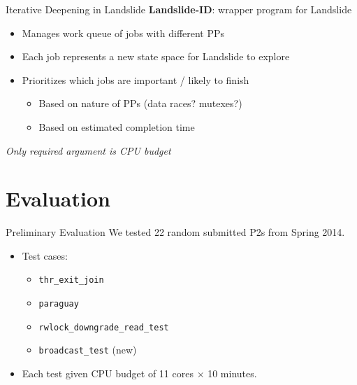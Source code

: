 \documentclass[xcolor=dvipsnames]{beamer}
\begin{document}
\begin{frame}{Iterative Deepening in Landslide}
	\textbf{Landslide-ID}: wrapper program for Landslide
	\begin{itemize}
		\item Manages work queue of jobs with different PPs
		\item Each job represents a new state space for Landslide to explore
		\item Prioritizes which jobs are important / likely to finish
		\begin{itemize}
			\item Based on nature of PPs (data races? mutexes?)
			\item Based on estimated completion time
		\end{itemize}
	\end{itemize}

	\linegap
	{\em Only required argument is CPU budget}
\end{frame}


\section{Evaluation}

\begin{frame}{Preliminary Evaluation}
	We tested 22 random submitted P2s from Spring 2014.
	\begin{itemize}
		\item Test cases:
		\begin{itemize}
			\item {\tt thr\_exit\_join}
			\item {\tt paraguay}
			\item {\tt rwlock\_downgrade\_read\_test}
			\item {\tt broadcast\_test} (new)
		\end{itemize}
		\item Each test given CPU budget of 11 cores $\times$ 10 minutes.
	\end{itemize}
\end{frame}
\end{document}
